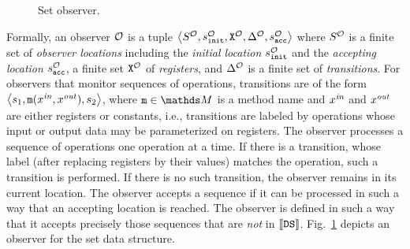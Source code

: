 \begin{figure}
\begin{center}
\end{center}
\caption{Set observer.}
\label{set:observer:fig}
\end{figure}

Formally, an observer ${\mathcal O}$ is a tuple
$\left\langle S^{\mathcal O},s^{\mathcal O}_{\tt init},{\tt X}^{{\mathcal O}},\Delta^{\mathcal O},s^{\mathcal O}_{\tt acc}\right\rangle$ where $S^{\mathcal O}$ is a finite set 
of {\it observer locations} including the 
{\it initial location} $s^{\mathcal O}_{\tt init}$ and
the {\it accepting location} $s^{\mathcal O}_{\tt acc}$, 
a finite set ${\tt X}^{{\mathcal O}}$  
of {\it registers}, and $\Delta^{\mathcal O}$ is a finite
set of {\it transitions}.
%
%
For observers that monitor sequences of operations,
transitions are of the form 
$\left\langle s_1,{\tt m}(x^{\it in},x^{\it out}),s_2\right\rangle$,
where $\mname\in\malphabet$ is a method name and 
$x^{\it in}$ and $x^{\it out}$ are either registers or constants, i.e.,
transitions are labeled by 
operations whose input or output data may be parameterized on registers.
The observer processes a sequence of operations one operation at a time.
%
If there is a transition, whose label (after replacing registers by their
values) matches the operation, such a transition is performed. 
%
If there is no
such transition, the observer remains in its current location.
The observer accepts a sequence if it can  be processed in such a way that
an accepting location is reached.
%
The observer is defined in such a way that it accepts precisely those
sequences that are {\em not} in $\left\llbracket{{\tt DS}}\right\rrbracket$.
Fig.~\ref{set:observer:fig}
depicts an observer for the set data structure.

